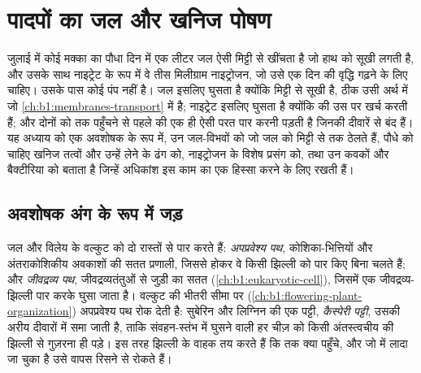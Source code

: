 \chapter{पादपों का जल और खनिज पोषण}\label{ch:b1:plant-water-minerals}

जुलाई में कोई मक्का का पौधा दिन में एक लीटर जल ऐसी मिट्टी से खींचता है जो
हाथ को सूखी लगती है, और उसके साथ नाइट्रेट के रूप में वे तीस मिलीग्राम
नाइट्रोजन, जो उसे एक दिन की वृद्धि गढ़ने के लिए चाहिए। उसके पास कोई पंप
नहीं है। जल इसलिए घुसता है क्योंकि  मिट्टी से सूखी है, ठीक उसी अर्थ
में जो \cref{ch:b1:membranes-transport} में है; नाइट्रेट इसलिए घुसता है
क्योंकि  की  उस पर  खर्च करती हैं; और दोनों को  तक
पहुँचने से पहले  की एक ही ऐसी परत पार करनी पड़ती है जिनकी
दीवारें  से बंद हैं। यह अध्याय  को एक अवशोषक  के रूप में, उन
जल-विभवों को जो जल को मिट्टी से  तक ठेलते हैं, पौधे को चाहिए खनिज
तत्वों और उन्हें लेने के ढंग को, नाइट्रोजन के विशेष प्रसंग को, तथा उन
कवकों और बैक्टीरिया को बताता है जिन्हें अधिकांश  इस काम का एक हिस्सा
करने के लिए रखती हैं।

\section{अवशोषक अंग के रूप में जड़}

\begin{definition}[अपप्रवेश्य पथ, जीवद्रव्य पथ, अंतस्त्वचा]\label{def:b1:plant-water-minerals:pathways}
जल और विलेय  के वल्कुट को दो रास्तों से पार करते हैं: \emph{अपप्रवेश्य
पथ}, कोशिका-भित्तियों और अंतराकोशिकीय अवकाशों की सतत प्रणाली, जिससे होकर
वे किसी झिल्ली को पार किए बिना चलते हैं; और \emph{जीवद्रव्य पथ},
जीवद्रव्यतंतुओं से जुड़ी  का सतत 
(\cref{ch:b1:eukaryotic-cell}), जिसमें एक जीवद्रव्य-झिल्ली पार करके घुसा
जाता है। वल्कुट की भीतरी सीमा पर \emph{}
(\cref{ch:b1:flowering-plant-organization}) अपप्रवेश्य पथ रोक देती है:
सुबेरिन और लिग्निन की एक पट्टी, \emph{कैस्पेरी पट्टी}, उसकी अरीय
दीवारों में समा जाती है, ताकि संवहन-स्तंभ में घुसने वाली हर चीज़ को किसी
अंतस्त्वचीय  की झिल्ली से गुज़रना ही पड़े। इस तरह झिल्ली के वाहक
तय करते हैं कि  तक क्या पहुँचे, और जो  में लादा जा चुका है उसे
वापस रिसने से रोकते हैं।
\end{definition}

